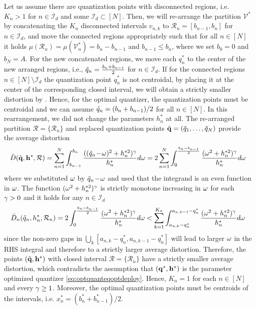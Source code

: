\documentclass[12pt,onecolumn,final,letterpaper]{IEEEtran}
\newcommand{\Ind}{\mathcal{I}}
\renewcommand{\vp}{\mathbf q}
\newcommand{\Vor}{\ensuremath{\mathcal{V}}}         %
\newcommand{\Rset}{\ensuremath{\mathcal R}}
\newcommand{\Dis}{\ensuremath{D}}                    %
\newcommand{\AvDis}{\ensuremath{\bar{\Dis}}}         %
\begin{document}
  Let us assume there are quantization points with disconnected regions, i.e. $K_n>1$ for $n\in\Ind_d$ and some
  $\Ind_d\subset[N]$. Then, we will re-arrange the partition $\Vor^*$ by concatenating the $K_n$ disconnected
  intervals $v_{n,k}$ to $\Rset_n=[b_{n-1},b_{n}]$ for $n\in\Ind_d$, and move the connected regions appropriately such that
  for all $n\in[N]$ it holds $\mu(\Rset_n)=\mu(\Vor^*_n)=b_n-b_{n-1}$ and $b_{n-1}\leq b_{n}$, where we set $b_0=0$ and
  $b_N=A$. For the new concatenated regions, we move each $q_n^*$ to the center of the new arranged regions, i.e.,
  $\tilde{q}_n=\frac{b_n+b_{n-1}}{2}$ for $n\in\Ind_d$. If for the connected regions $n\in[N]\setminus\Ind_d$  the
  quantization point $q^*_n$ is not centroidal, by placing it at the center of the corresponding closed interval,
  we will obtain a strictly smaller distortion by . Hence, for the optimal quantizer, the quantization
  points must be centroidal and we can assume $\tilde{q}_n=(b_n+b_{n-1})/2$ for all $n\in[N]$. 
  In this rearrangement, we did not change the parameters $h_n^*$ at all.  The re-arranged partition
  $\Rset=\{\Rset_n\}$ and replaced quantization points $\tvp=(\tq_1,\dots,\tq_N)$ provide the average distortion 
  \begin{align}
    \AvDis(\tvp,\vh^*,\Rset)=\sum_{n=1}^N \int_{b_{n-1}}^{b_n} \frac{ ((\tq_n\!-\!\ome)^2+h_n^{*2})^{\gam}}{h_n^{*}} d\ome
      = 2\sum_{n=1}^N \int_{0}^{\frac{b_n-b_{n-1}}{2}} \frac{ (\ome^2+h_n^{*2})^{\gam}}{h_n^{*}} d\ome
  \end{align}
  where we substituted $\omega$ by $\tilde{q}_n\!-\!\omega$ and used that the integrand is an even function in $\omega$. The
  function $(\omega^2+h_n^{*2})^{\gamma}$ is strictly monotone increasing in $\omega$ for each $\gamma>0$ and it holds for any
  $n\in\Ind_d$
  \begin{align}
   \AvDis_n(\tq_n,h_n^*,\Rset_n)=    2\int_{0}^{\frac{b_n-b_{n-1}}{2}} \frac{ (\ome^2+h_n^{*2})^{\gam}}{h_n^{*}} d\ome 
    < \sum_{k=1}^{K_n}\int_{a_{n,k}-q_n^*}^{a_{n,k-1}-q_n^*} \frac{ (\ome^2+h_n^{*2})^{\gam}}{h_n^{*}}
    d\ome\label{eq:Avdisn}
  \end{align}
  since the non-zero gaps in $\bigcup_k [a_{n,k}-q_n^*,a_{n,k-1}-q_n^*]$ will lead to larger $\omega$ in the RHS integral
  and therefore to a strictly larger average distortion.  Therefore, the points $(\tvp,\vh^*)$ with closed interval
  $\Rset=\{\Rset_n\}$ have a strictly smaller average distortion, which contradicts the assumption that $(\vp^*,\vh^*)$
  is the parameter optimized quantizer \eqref{eq:optquanteqoptdeploy}. Hence, $K_n=1$ for each $n\in[N]$ and every
  $\gamma\geq 1$.  Moreover, the optimal quantization points must be centroids of the intervals, i.e.
  $x_n^*=(b_n^*+b^*_{n-1})/2$.
\end{document}

